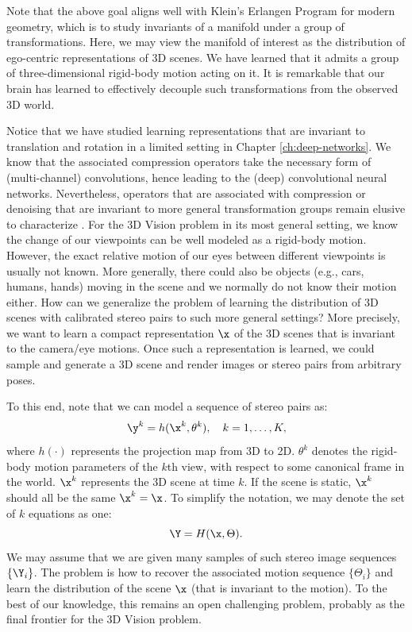 \documentclass[../../book-main_zh.tex]{subfiles}
\begin{document}
\begin{remark}Note that the above goal aligns well with Klein's
    Erlangen Program for modern geometry, which is to study
    invariants of a manifold under a group of transformations. Here,
    we may view the manifold of interest as the distribution of
    ego-centric representations of 3D scenes. We have learned that it
    admits a group of three-dimensional rigid-body motion acting on
    it. It is remarkable that our brain has learned to effectively
    decouple such transformations from the observed 3D world.
\end{remark}

Notice that we have studied learning representations that are
invariant to translation and rotation in a limited setting in Chapter
\ref{ch:deep-networks}. We know that the associated compression
operators take the necessary form of (multi-channel) convolutions,
hence leading to the (deep) convolutional neural networks.
Nevertheless, operators that are associated with compression or
denoising that are invariant to more general transformation groups
remain elusive to characterize \cite{cohen2016group}.
For the 3D Vision problem in its most general setting, we know the
change of our viewpoints can be well modeled as a rigid-body motion.
However, the exact relative motion of our eyes between different
viewpoints is usually not known. More generally, there could also be
objects (e.g., cars, humans, hands) moving in the scene and we
normally do not know their motion either. How can we generalize the
problem of learning the distribution of 3D scenes with calibrated
stereo pairs to such more general settings? More precisely, we want
to learn a compact representation $\x$ of the 3D scenes that is
invariant to the camera/eye motions. Once such a representation is
learned, we could sample and generate a 3D scene and render images or
stereo pairs from arbitrary poses.

To this end, note that we can model a sequence of stereo pairs as:
\begin{equation}
    \y^k = h(\x^k, \theta^k), \quad k=1, \ldots, K,
\end{equation}
where $h(\cdot)$ represents the projection map from 3D to 2D.
$\theta^k$ denotes the rigid-body motion parameters of the $k$th
view, with respect to some canonical frame in the world. $\x^k$
represents the 3D scene at time $k$. If the scene is static, $\x^k$
should all be the same $\x^k = \x$. To simplify the notation, we may
denote the set of $k$ equations as one:
\begin{equation}
    \Y = H(\x,\Theta).
\end{equation}
We may assume that we are given many samples of such stereo image
sequences $\{\Y_i\}$. The problem is how to recover the associated
motion sequence $\{\Theta_i\}$ and learn the distribution of the
scene $\x$ (that is invariant to the motion). To the best of our
knowledge, this remains an open challenging problem, probably as the
final frontier for the 3D Vision problem.
\end{document}
